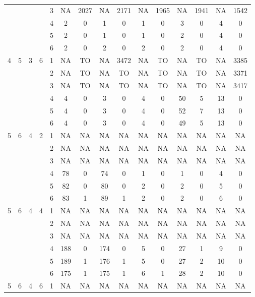 \begin{longtable}{|c|c|c|c|c|c c|c c|c c|c c|c c|}
 & & & & 3 & NA & 2027 & NA & 2171 & NA & 1965 & NA & 1941 & NA & 1542 \\
 & & & & 4 & 2 & 0 & 1 & 0 & 1 & 0 & 3 & 0 & 4 & 0 \\
 & & & & 5 & 2 & 0 & 1 & 0 & 1 & 0 & 2 & 0 & 4 & 0 \\
 & & & & 6 & 2 & 0 & 2 & 0 & 2 & 0 & 2 & 0 & 4 & 0 \\
\hline
\multirow{6}{*}{4} & \multirow{6}{*}{5} & \multirow{6}{*}{3} & \multirow{6}{*}{6} & 1 & NA & TO & NA & 3472 & NA & TO & NA & TO & NA & 3385 \\
 & & & & 2 & NA & TO & NA & TO & NA & TO & NA & TO & NA & 3371 \\
 & & & & 3 & NA & TO & NA & TO & NA & TO & NA & TO & NA & 3417 \\
 & & & & 4 & 4 & 0 & 3 & 0 & 4 & 0 & 50 & 5 & 13 & 0 \\
 & & & & 5 & 4 & 0 & 3 & 0 & 4 & 0 & 52 & 7 & 13 & 0 \\
 & & & & 6 & 4 & 0 & 3 & 0 & 4 & 0 & 49 & 5 & 13 & 0 \\
\hline
\multirow{6}{*}{5} & \multirow{6}{*}{6} & \multirow{6}{*}{4} & \multirow{6}{*}{2} & 1 & NA & NA & NA & NA & NA & NA & NA & NA & NA & NA \\
 & & & & 2 & NA & NA & NA & NA & NA & NA & NA & NA & NA & NA \\
 & & & & 3 & NA & NA & NA & NA & NA & NA & NA & NA & NA & NA \\
 & & & & 4 & 78 & 0 & 74 & 0 & 1 & 0 & 1 & 0 & 4 & 0 \\
 & & & & 5 & 82 & 0 & 80 & 0 & 2 & 0 & 2 & 0 & 5 & 0 \\
 & & & & 6 & 83 & 1 & 89 & 1 & 2 & 0 & 2 & 0 & 6 & 0 \\
\hline
\multirow{6}{*}{5} & \multirow{6}{*}{6} & \multirow{6}{*}{4} & \multirow{6}{*}{4} & 1 & NA & NA & NA & NA & NA & NA & NA & NA & NA & NA \\
 & & & & 2 & NA & NA & NA & NA & NA & NA & NA & NA & NA & NA \\
 & & & & 3 & NA & NA & NA & NA & NA & NA & NA & NA & NA & NA \\
 & & & & 4 & 188 & 0 & 174 & 0 & 5 & 0 & 27 & 1 & 9 & 0 \\
 & & & & 5 & 189 & 1 & 176 & 1 & 5 & 0 & 27 & 2 & 10 & 0 \\
 & & & & 6 & 175 & 1 & 175 & 1 & 6 & 1 & 28 & 2 & 10 & 0 \\
\hline
\multirow{6}{*}{5} & \multirow{6}{*}{6} & \multirow{6}{*}{4} & \multirow{6}{*}{6} & 1 & NA & NA & NA & NA & NA & NA & NA & NA & NA & NA \\

\end{longtable}
